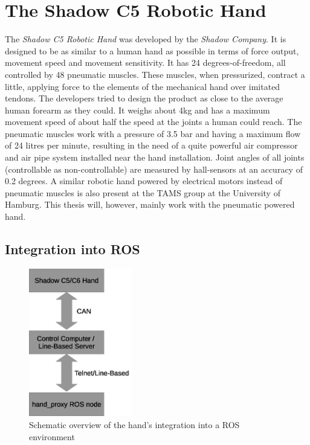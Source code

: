 \section{The Shadow C5 Robotic Hand}
The \textit{Shadow C5 Robotic Hand} was developed by the \textit{Shadow Company}. It is designed to be as similar to a human hand as possible\cite{web:robothand:spec} in terms of force output, movement speed and movement sensitivity. It has 24 degrees-of-freedom, all controlled by 48 pneumatic muscles. These muscles, when pressurized, contract a little, applying force to the elements of the mechanical hand over imitated tendons. The developers tried to design the product as close to the average human forearm as they could. It weighs about 4kg and has a maximum movement speed of about half the speed at the joints a human could reach. The pneumatic muscles work with a pressure of 3.5 bar and having a maximum flow of 24 litres per minute, resulting in the need of a quite powerful air compressor and air pipe system installed near the hand installation. Joint angles of all joints (controllable as non-controllable) are measured by hall-sensors at an accuracy of 0.2 degrees.
A similar robotic hand powered by electrical motors instead of pneumatic muscles is also present at the TAMS group at the University of Hamburg. This thesis will, however, mainly work with the pneumatic powered hand. 

\subsection{Integration into ROS}

\begin{figure}
	\caption{\label{fig:hand:ros_integration}Schematic overview of the hand's integration into a ROS environment}
	\includegraphics[width=0.4\textwidth]{assets/chpt_basics/hand/ros_integration.eps}
\end{figure}

